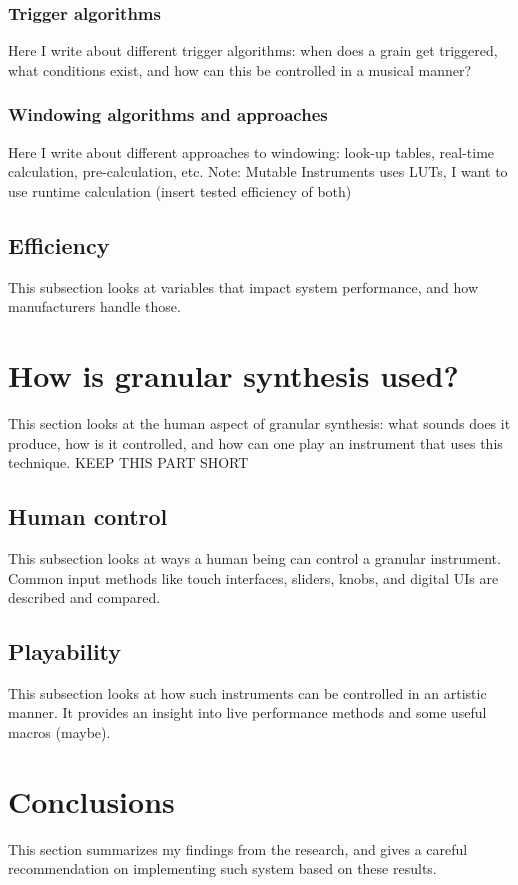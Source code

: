 \documentclass[10pt, twocolumn]{IEEEtran}
\begin{document}
\subsubsection{Trigger algorithms}
Here I write about different trigger algorithms: when does a grain get triggered, what conditions exist, and how can this be controlled in a musical manner?
\subsubsection{Windowing algorithms and approaches}
Here I write about different approaches to windowing: look-up tables, real-time calculation, pre-calculation, etc.
Note: Mutable Instruments uses LUTs, I want to use runtime calculation (insert tested efficiency of both)

\subsection{Efficiency}
This subsection looks at variables that impact system performance, and how manufacturers handle those.

\section{How is granular synthesis used?}
This section looks at the human aspect of granular synthesis: what sounds does it produce, how is it controlled, and how can one play an instrument that uses this technique. KEEP THIS PART SHORT

\subsection{Human control}
This subsection looks at ways a human being can control a granular instrument. Common input methods like touch interfaces, sliders, knobs, and digital UIs are described and compared.

\subsection{Playability}
This subsection looks at how such instruments can be controlled in an artistic manner. It provides an insight into live performance methods and some useful macros (maybe).

\section*{Conclusions}
This section summarizes my findings from the research, and gives a careful recommendation on implementing such system based on these results.
\end{document}
